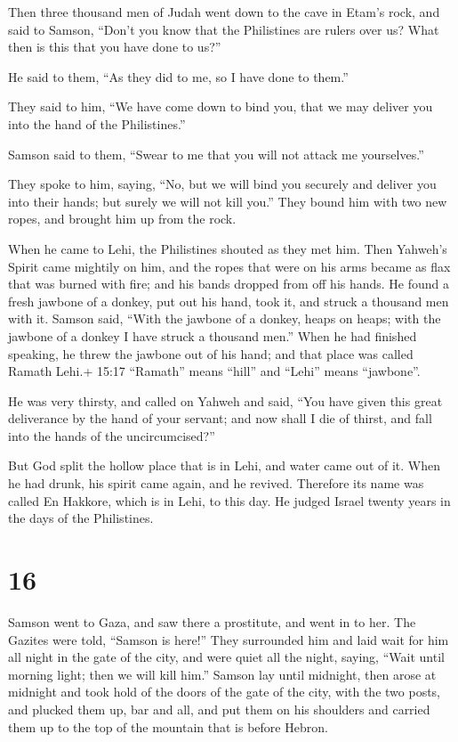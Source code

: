  Then three thousand men of Judah went down to the cave in
Etam's rock, and said to Samson, ``Don't you know that the Philistines
are rulers over us? What then is this that you have done to us?''

He said to them, ``As they did to me, so I have done to them.''

 They said to him, ``We have come down to bind you, that we
may deliver you into the hand of the Philistines.''

Samson said to them, ``Swear to me that you will not attack me
yourselves.''

 They spoke to him, saying, ``No, but we will bind you
securely and deliver you into their hands; but surely we will not kill
you.'' They bound him with two new ropes, and brought him up from the
rock.

 When he came to Lehi, the Philistines shouted as they met
him. Then Yahweh's Spirit came mightily on him, and the ropes that were
on his arms became as flax that was burned with fire; and his bands
dropped from off his hands.  He found a fresh jawbone of a
donkey, put out his hand, took it, and struck a thousand men with it.
 Samson said, ``With the jawbone of a donkey, heaps on
heaps; with the jawbone of a donkey I have struck a thousand men.''
 When he had finished speaking, he threw the jawbone out of
his hand; and that place was called Ramath Lehi.+ 15:17 ``Ramath'' means
``hill'' and ``Lehi'' means ``jawbone''.

 He was very thirsty, and called on Yahweh and said, ``You
have given this great deliverance by the hand of your servant; and now
shall I die of thirst, and fall into the hands of the uncircumcised?''

 But God split the hollow place that is in Lehi, and water
came out of it. When he had drunk, his spirit came again, and he
revived. Therefore its name was called En Hakkore, which is in Lehi, to
this day.  He judged Israel twenty years in the days of the
Philistines.

\hypertarget{section-15}{%
\section{16}\label{section-15}}

 Samson went to Gaza, and saw there a prostitute, and went
in to her.  The Gazites were told, ``Samson is here!'' They
surrounded him and laid wait for him all night in the gate of the city,
and were quiet all the night, saying, ``Wait until morning light; then
we will kill him.''  Samson lay until midnight, then arose
at midnight and took hold of the doors of the gate of the city, with the
two posts, and plucked them up, bar and all, and put them on his
shoulders and carried them up to the top of the mountain that is before
Hebron.

